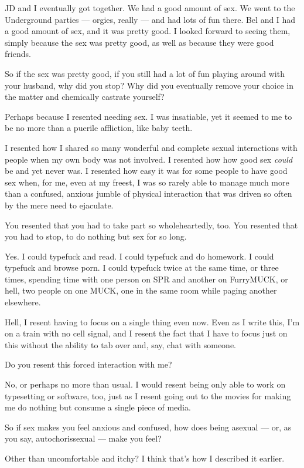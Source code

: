 \begin{leftcolumn}
JD and I eventually got together. We had a good amount of sex. We went to the Underground parties --- orgies, really --- and had lots of fun there. Bel and I had a good amount of sex, and it was pretty good. I looked forward to seeing them, simply because the sex was pretty good, as well as because they were good friends.

\begin{ally}
So if the sex was pretty good, if you still had a lot of fun playing around with your husband, why did you stop? Why did you eventually remove your choice in the matter and chemically castrate yourself?
\end{ally}
Perhaps because I resented needing sex. I was insatiable, yet it seemed to me to be no more than a puerile affliction, like baby teeth.

I resented how I shared so many wonderful and complete sexual interactions with people when my own body was not involved. I resented how how good sex \emph{could} be and yet never was. I resented how easy it was for some people to have good sex when, for me, even at my freest, I was so rarely able to manage much more than a confused, anxious jumble of physical interaction that was driven so often by the mere need to ejaculate.

\begin{ally}
You resented that you had to take part so wholeheartedly, too. You resented that you had to stop, to do nothing but sex for so long.
\end{ally}
Yes. I could typefuck and read. I could typefuck and do homework. I could typefuck and browse porn. I could typefuck twice at the same time, or three times, spending time with one person on SPR and another on FurryMUCK, or hell, two people on one MUCK, one in the same room while paging another elsewhere.

Hell, I resent having to focus on a single thing even now. Even as I write this, I'm on a train with no cell signal, and I resent the fact that I have to focus just on this without the ability to tab over and, say, chat with someone.

\begin{ally}
Do you resent this forced interaction with me?
\end{ally}
No, or perhaps no more than usual. I would resent being only able to work on typesetting or software, too, just as I resent going out to the movies for making me do nothing but consume a single piece of media.
\newpage

\begin{ally}
So if sex makes you feel anxious and confused, how does being asexual --- or, as you say, autochorissexual --- make you feel?
\end{ally}
Other than uncomfortable and itchy? I think that's how I described it earlier.


\end{leftcolumn}

